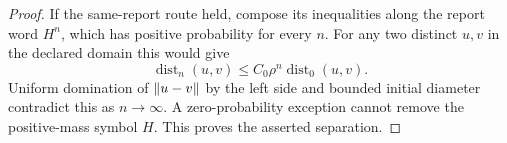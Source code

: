 \begin{proof}
If the same-report route held, compose its inequalities along the report word $H^n$, which has positive probability for every $n$. For any two distinct $u,v$ in the declared domain this would give
\[
 \operatorname{dist}_n(u,v)\le C_0\rho^n\operatorname{dist}_0(u,v).
\]
Uniform domination of $\lVert u-v\rVert$ by the left side and bounded initial diameter contradict this as $n\to\infty$. A zero-probability exception cannot remove the positive-mass symbol $H$. This proves the asserted separation.
\end{proof}
